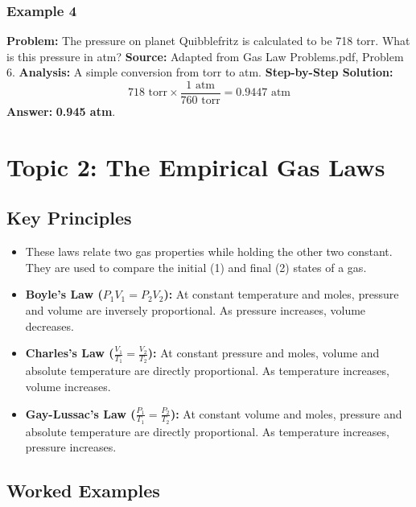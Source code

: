 \documentclass{article}
\begin{document}
\subsubsection{Example 4}
\textbf{Problem:} The pressure on planet Quibblefritz is calculated to be 718 torr. What is this pressure in atm?
\textbf{Source:} Adapted from Gas Law Problems.pdf, Problem 6.
\textbf{Analysis:} A simple conversion from torr to atm.
\textbf{Step-by-Step Solution:}
\[ 718 \text{ torr} \times \frac{1 \text{ atm}}{760 \text{ torr}} = 0.9447 \text{ atm} \]
\textbf{Answer:} \textbf{0.945 atm}.

\section{Topic 2: The Empirical Gas Laws}
\subsection{Key Principles}
\begin{itemize}
    \item These laws relate two gas properties while holding the other two constant. They are used to compare the initial (1) and final (2) states of a gas.
    \item \textbf{Boyle's Law ($P_1V_1 = P_2V_2$):} At constant temperature and moles, pressure and volume are inversely proportional. As pressure increases, volume decreases.
    \item \textbf{Charles's Law ($\frac{V_1}{T_1} = \frac{V_2}{T_2}$):} At constant pressure and moles, volume and absolute temperature are directly proportional. As temperature increases, volume increases.
    \item \textbf{Gay-Lussac's Law ($\frac{P_1}{T_1} = \frac{P_2}{T_2}$):} At constant volume and moles, pressure and absolute temperature are directly proportional. As temperature increases, pressure increases.
\end{itemize}

\subsection{Worked Examples}
\end{document}
